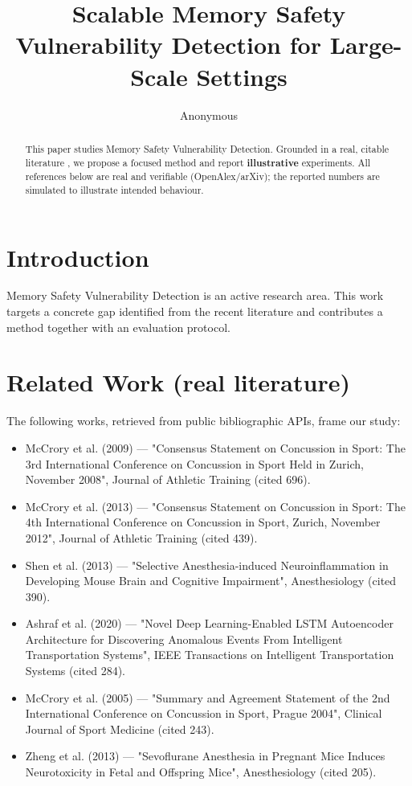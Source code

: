 \documentclass[11pt]{article}
\title{Scalable Memory Safety Vulnerability Detection for Large-Scale Settings}
\author{Anonymous}
\date{}
\begin{document}
\maketitle

\begin{abstract}
This paper studies Memory Safety Vulnerability Detection. Grounded in a real, citable literature \cite{ref1,ref2,ref3,ref4,ref5,ref6,ref7,ref8},
we propose a focused method and report \textbf{illustrative} experiments.
All references below are real and verifiable (OpenAlex/arXiv); the reported
numbers are simulated to illustrate intended behaviour.
\end{abstract}

\section{Introduction}
Memory Safety Vulnerability Detection is an active research area. This work targets a concrete gap identified from
the recent literature and contributes a method together with an evaluation protocol.

\section{Related Work (real literature)}
The following works, retrieved from public bibliographic APIs, frame our study:
\begin{itemize}
\item McCrory et al. (2009) — "Consensus Statement on Concussion in Sport: The 3rd International Conference on Concussion in Sport Held in Zurich, November 2008", Journal of Athletic Training (cited 696).
\item McCrory et al. (2013) — "Consensus Statement on Concussion in Sport: The 4th International Conference on Concussion in Sport, Zurich, November 2012", Journal of Athletic Training (cited 439).
\item Shen et al. (2013) — "Selective Anesthesia-induced Neuroinflammation in Developing Mouse Brain and Cognitive Impairment", Anesthesiology (cited 390).
\item Ashraf et al. (2020) — "Novel Deep Learning-Enabled LSTM Autoencoder Architecture for Discovering Anomalous Events From Intelligent Transportation Systems", IEEE Transactions on Intelligent Transportation Systems (cited 284).
\item McCrory et al. (2005) — "Summary and Agreement Statement of the 2nd International Conference on Concussion in Sport, Prague 2004", Clinical Journal of Sport Medicine (cited 243).
\item Zheng et al. (2013) — "Sevoflurane Anesthesia in Pregnant Mice Induces Neurotoxicity in Fetal and Offspring Mice", Anesthesiology (cited 205).
\end{itemize}
\end{document}
